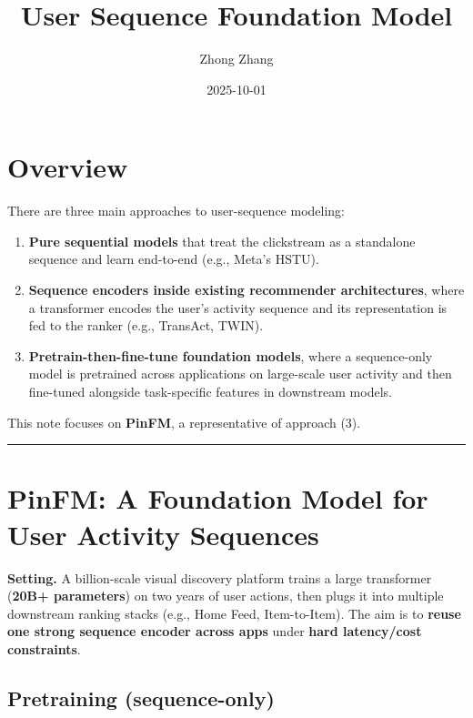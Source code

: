 \documentclass[
  letterpaper,
  DIV=11,
  numbers=noendperiod]{scrartcl}
\title{User Sequence Foundation Model}
\author{Zhong Zhang}
\date{2025-10-01}
\providecommand{\tightlist}{%
  \setlength{\itemsep}{0pt}\setlength{\parskip}{0pt}}
\begin{document}
\maketitle


\section{Overview}\label{overview}

There are three main approaches to user-sequence modeling:

\begin{enumerate}
\def\labelenumi{\arabic{enumi}.}
\tightlist
\item
  \textbf{Pure sequential models} that treat the clickstream as a
  standalone sequence and learn end-to-end (e.g., Meta's HSTU).
\item
  \textbf{Sequence encoders inside existing recommender architectures},
  where a transformer encodes the user's activity sequence and its
  representation is fed to the ranker (e.g., TransAct, TWIN).
\item
  \textbf{Pretrain-then-fine-tune foundation models}, where a
  sequence-only model is pretrained across applications on large-scale
  user activity and then fine-tuned alongside task-specific features in
  downstream models.
\end{enumerate}

This note focuses on \textbf{PinFM}, a representative of approach (3).

\begin{center}\rule{0.5\linewidth}{0.5pt}\end{center}

\section{PinFM: A Foundation Model for User Activity
Sequences}\label{pinfm-a-foundation-model-for-user-activity-sequences}

\textbf{Setting.} A billion-scale visual discovery platform trains a
large transformer (\textbf{20B+ parameters}) on two years of user
actions, then plugs it into multiple downstream ranking stacks (e.g.,
Home Feed, Item-to-Item). The aim is to \textbf{reuse one strong
sequence encoder across apps} under \textbf{hard latency/cost
constraints}.

\subsection{Pretraining
(sequence-only)}\label{pretraining-sequence-only}
\end{document}
